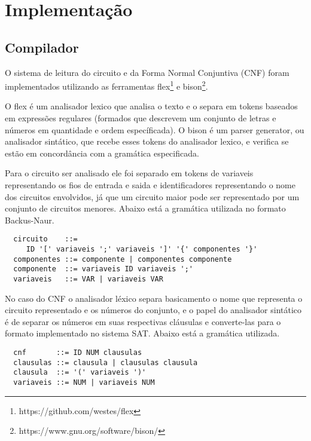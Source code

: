 \section{Implementação}
\label{sec:implementacao}


\subsection{Compilador}
\label{sec:Compilador}
O sistema de leitura do circuito e da Forma Normal Conjuntiva (CNF) foram implementados utilizando as ferramentas flex\footnote{https://github.com/westes/flex} e bison\footnote{https://www.gnu.org/software/bison/}.%

O flex é um analisador lexico%
que analisa o texto e o separa em tokens baseados em expressões regulares (formados que descrevem um conjunto de letras e números em quantidade e ordem específicada). O bison é um parser generator, ou analisador sintático, que recebe esses tokens do analisador lexico, e verifica se estão em concordância com a gramática
especificada.

Para o circuito ser analisado ele foi separado em tokens de variaveis representando os fios de entrada e saida e identificadores representando o nome dos circuitos envolvidos, já que um circuito maior pode ser representado por um conjunto de circuitos menores. Abaixo está a gramática utilizada no formato
Backus-Naur.
\begin{lstlisting}
  circuito    ::=
     ID '[' variaveis ';' variaveis ']' '{' componentes '}'
  componentes ::= componente | componentes componente
  componente  ::= variaveis ID variaveis ';'
  variaveis   ::= VAR | variaveis VAR
\end{lstlisting}

No caso do CNF o analisador léxico separa basicamento o nome que representa o circuito representado e os números do conjunto, e o papel do analisador sintático é de separar os números em suas respectivas cláusulas e converte-las para o formato implementado no sistema SAT. Abaixo está a gramática utilizada.
\begin{lstlisting}
  cnf       ::= ID NUM clausulas
  clausulas ::= clausula | clausulas clausula
  clausula  ::= '(' variaveis ')'
  variaveis ::= NUM | variaveis NUM
\end{lstlisting}

